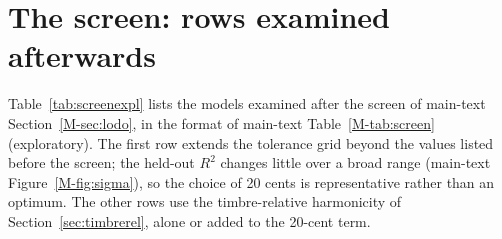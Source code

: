 \documentclass[11pt,a4paper]{article}
\begin{document}
\begin{table}[h]
\centering
\caption{Random-effects pooled estimates with the DerSimonian--Laird (DL, normal) and
Hartung--Knapp ($t$ distribution with $k-1$ degrees of freedom) 95\% intervals, SD units, each model fitted to the
experiment itself. Harmonic: six US experiments with harmonic spectra; eight: adds pure tones
and the bonang.}
\label{tab:suppdl}
\scriptsize
\setlength{\tabcolsep}{2.5pt}
\end{table}

\begin{table}[h]
\centering
\caption{Mean of the fourth and fifth minus the tritone (the dip), observed and left
unexplained [95\% participant-bootstrap CI], SD units, each model fitted to the experiment
itself. Bold: CI excludes zero. The composite of Marjieh et al.\ was fitted to these data.}
\label{tab:dip}
\footnotesize
\setlength{\tabcolsep}{4pt}
\end{table}

\section{The screen: rows examined afterwards}
\label{sec:screenexpl}
Table~\ref{tab:screenexpl} lists the models examined after the screen of
main-text Section~\ref{M-sec:lodo}, in the format of main-text Table~\ref{M-tab:screen}
(exploratory). The first row extends the tolerance grid beyond the values listed before the screen; the
held-out $R^2$ changes little over a broad range (main-text Figure~\ref{M-fig:sigma}), so the
choice of 20 cents is representative rather than an optimum. The other rows use the
timbre-relative harmonicity of Section~\ref{sec:timbrerel}, alone or added to the 20-cent
term.
\end{document}
